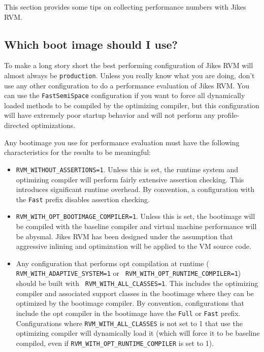 This section provides some tips on collecting performance numbers with
Jikes RVM.

\subsection{Which boot image should I use?}

To make a long story short the best performing configuration of Jikes
RVM will almost always be {\tt production}.  Unless you really know
what you are doing, don't use any other configuration to do a
performance evaluation of Jikes RVM. 
You can use the {\tt FastSemiSpace} configuration if you want to force
all dynamically loaded methods to be compiled by the optimizing
compiler, but this configuration will have extremely poor startup
behavior and will not perform any profile-directed optimizations.

Any bootimage you use for performance evaluation must have the
following characteristics for the results to be meaningful:
\begin{itemize} 
\item {\tt RVM\_WITHOUT\_ASSERTIONS=1}. Unless this is set, the runtime
system and optimizing compiler will perform fairly extensive assertion
checking. This introduces significant runtime overhead. By convention,
a configuration with the {\tt Fast} prefix disables assertion
checking.
\item {\tt RVM\_WITH\_OPT\_BOOTIMAGE\_COMPILER=1}. Unless this is set, the
bootimage will be compiled with the baseline compiler and virtual
machine performance will be abysmal.  Jikes RVM has been designed
under the assumption that aggressive inlining and optimization will be
applied to the VM source code. 
\item Any configuration that performs opt compilation at runtime (
{\tt RVM\_WITH\_ADAPTIVE\_SYSTEM=1} or {\tt
RVM\_WITH\_OPT\_RUNTIME\_COMPILER=1}) should be built with {\tt
RVM\_WITH\_ALL\_CLASSES=1}.  This includes the optimizing compiler and
associated support classes in the bootimage where they can be
optimized by the bootimage compiler. By convention, configurations
that include the opt compiler in the bootimage have the {\tt Full} or
{\tt Fast} prefix.  Configurations where {\tt RVM\_WITH\_ALL\_CLASSES}
is not set to 1 that use the optimizing compiler will dynamically load
it (which will force it to be baseline compiled, even if
{\tt RVM\_WITH\_OPT\_RUNTIME\_COMPILER} is set to 1).
\end{itemize}

